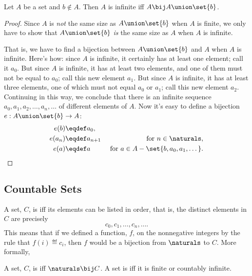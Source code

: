\begin{lemma}\label{AUb}
  Let $A$ be a set and $b \notin A$.  Then $A$ is infinite iff $A \bij
  A \union \set{b}$.
\end{lemma}
\begin{proof}
  Since $A$ is \emph{not} the same size as $A \union \set{b}$ when $A$
  is finite, we only have to show that $A \union \set{b}$ \emph{is}
  the same size as $A$ when $A$ is infinite.

That is, we have to find a bijection between $A \union \set{b}$ and
$A$ when $A$ is infinite.  Here's how: since $A$ is infinite, it
certainly has at least one element; call it $a_0$.  But since $A$ is
infinite, it has at least two elements, and one of them must not be
equal to $a_0$; call this new element $a_1$.  But since $A$ is
infinite, it has at least three elements, one of which must not equal
$a_0$ or $a_1$; call this new element $a_2$.  Continuing in this way,
we conclude that there is an infinite sequence
$a_0,a_1,a_2,\dots,a_n,\dots$ of different elements of $A$.  Now it's
easy to define a bijection $e: A \union \set{b} \to A$:
\begin{align*}
e(b) & \eqdef a_0,\\ e(a_n) & \eqdef a_{n+1} &\text{ for } n \in
\naturals,\\ e(a) & \eqdef a & \text{ for } a \in A -
\set{b,a_0,a_1,\dots}.
\end{align*}
\end{proof}

\subsection{Countable Sets}
A set, $C$, is  iff its elements can be listed in
order, that is, the distinct elements in $C$ are precisely
\[
c_0, c_1, \dots, c_n, \dots.
\]
This means that if we defined a function, $f$, on the nonnegative
integers by the rule that $f(i) \eqdef c_i$, then $f$ would be a
bijection from $\naturals$ to $C$.  More formally,

\begin{definition}
  A set, $C$, is  iff $\naturals \bij C$.  A
  set is  iff it is finite or countably infinite.
\end{definition}

